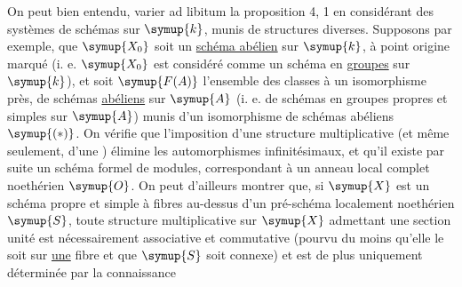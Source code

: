 On peut bien entendu, varier ad libitum la proposition 4, 1 en considérant des
systèmes de schémas sur $\symup{k}$, munis de structures diverses. Supposons par
exemple, que $\symup{X_0}$ soit un \uline{schéma abélien} sur $\symup{k}$, à point origine marqué
(i. e. $\symup{X_0}$ est considéré comme un schéma en \uline{groupes} sur $\symup{k}$), et soit $\symup{F(A)}$
l'ensemble des classes à un isomorphisme près, de schémas \uline{abéliens} sur $\symup{A}$
(i. e. de schémas en groupes propres et simples sur $\symup{A}$) munis d'un
isomorphisme de schémas abéliens $\symup{(*)}$. On vérifie que l'imposition d'une
structure multiplicative (et même seulement, d'une ) élimine
les automorphismes infinitésimaux, et qu'il existe par suite un schéma formel
de modules, correspondant à un anneau local complet noethérien $\symup{O}$. On peut
d'ailleurs montrer que, si $\symup{X}$ est un schéma propre et simple à fibres
 au-dessus d'un pré-schéma localement noethérien $\symup{S}$,
toute structure multiplicative sur $\symup{X}$ admettant une section unité est
nécessairement associative et commutative (pourvu du moins qu'elle le soit sur
\uline{une} fibre et que $\symup{S}$ soit connexe) et est de plus uniquement déterminée par la
connaissance

